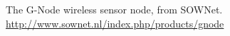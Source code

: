 \begin{thebibliography}{99}
  The G-Node wireless sensor node, from SOWNet. \\
  \url{http://www.sownet.nl/index.php/products/gnode}
%
%
%
%
%
%
%
%
%
%
%

\end{thebibliography}
